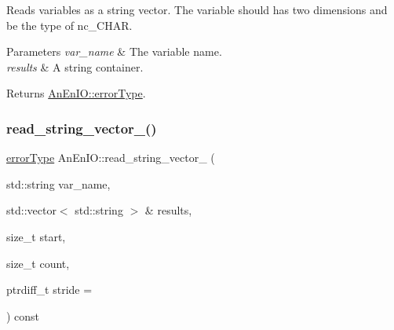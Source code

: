 Reads variables as a string vector. The variable should has two dimensions and be the type of nc\+\_\+\+C\+H\+AR.


\begin{DoxyParams}{Parameters}
{\em var\+\_\+name} & The variable name. \\
\hline
{\em results} & A string container. \\
\hline
\end{DoxyParams}
\begin{DoxyReturn}{Returns}
\mbox{\hyperlink{class_an_en_i_o_aa56bc1ec6610b86db4349bce20f9ead0}{An\+En\+I\+O\+::error\+Type}}. 
\end{DoxyReturn}
\mbox{\label{class_an_en_i_o_a8c7e28931fd88831922e64ad87ee03f2}} 
\subsubsection{\texorpdfstring{read\+\_\+string\+\_\+vector\+\_\+()}{read\_string\_vector\_()}\hspace{0.1cm}{\footnotesize\ttfamily [2/2]}}
{\footnotesize\ttfamily \mbox{\hyperlink{class_an_en_i_o_aa56bc1ec6610b86db4349bce20f9ead0}{error\+Type}} An\+En\+I\+O\+::read\+\_\+string\+\_\+vector\+\_\+ (\begin{DoxyParamCaption}\item[{std\+::string}]{var\+\_\+name,  }\item[{std\+::vector$<$ std\+::string $>$ \&}]{results,  }\item[{size\+\_\+t}]{start,  }\item[{size\+\_\+t}]{count,  }\item[{ptrdiff\+\_\+t}]{stride = {} }\end{DoxyParamCaption}) const\hspace{0.3cm}{\ttfamily [protected]}}

\mbox{\label{class_an_en_i_o_aa135f278f8ff2a028b8119f483dd36bf}} 
